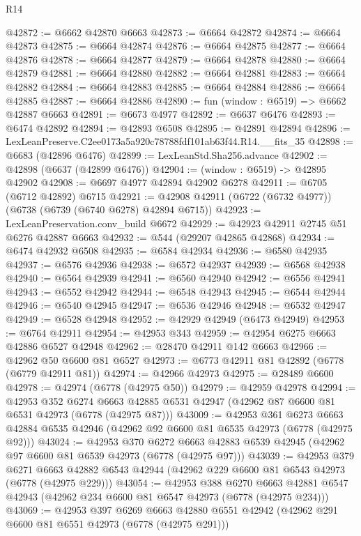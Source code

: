 \begin{lexlean}{R14}
\begin{coremodule}
@42872 := @6662 @42870 @6663
@42873 := @6664 @42872
@42874 := @6664 @42873
@42875 := @6664 @42874
@42876 := @6664 @42875
@42877 := @6664 @42876
@42878 := @6664 @42877
@42879 := @6664 @42878
@42880 := @6664 @42879
@42881 := @6664 @42880
@42882 := @6664 @42881
@42883 := @6664 @42882
@42884 := @6664 @42883
@42885 := @6664 @42884
@42886 := @6664 @42885
@42887 := @6664 @42886
@42890 := fun (window : @6519) => @6662 @42887 @6663
@42891 := @6673 @4977
@42892 := @6637 @6476
@42893 := @6474 @42892
@42894 := @42893 @6508
@42895 := @42891 @42894
@42896 := LexLeanPreserve.C2ee0173a5a920c78788fdf101ab63f44.R14.__fits_35
@42898 := @6683 (@42896 @6476)
@42899 := LexLeanStd.Sha256.advance
@42902 := @42898 (@6637 (@42899 @6476))
@42904 := (window : @6519) -> @42895 @42902
@42908 := @6697 @4977 @42894 @42902 @6278
@42911 := @6705 (@6712 @42892) @6715
@42921 := @42908 @42911 (@6722 (@6732 @4977)) (@6738 (@6739 (@6740 @6278) @42894 @6715))
@42923 := LexLeanPreservation.conv_build @6672
@42929 := @42923 @42911 @2745 @51 @6276 @42887 @6663
@42932 := @544 (@29207 @42865 @42868)
@42934 := @6474 @42932 @6508
@42935 := @6584 @42934
@42936 := @6580 @42935
@42937 := @6576 @42936
@42938 := @6572 @42937
@42939 := @6568 @42938
@42940 := @6564 @42939
@42941 := @6560 @42940
@42942 := @6556 @42941
@42943 := @6552 @42942
@42944 := @6548 @42943
@42945 := @6544 @42944
@42946 := @6540 @42945
@42947 := @6536 @42946
@42948 := @6532 @42947
@42949 := @6528 @42948
@42952 := @42929 @42949 (@6473 @42949)
@42953 := @6764 @42911
@42954 := @42953 @343
@42959 := @42954 @6275 @6663 @42886 @6527 @42948
@42962 := @28470 @42911 @142 @6663
@42966 := @42962 @50 @6600 @81 @6527
@42973 := @6773 @42911 @81 @42892 (@6778 (@6779 @42911 @81))
@42974 := @42966 @42973
@42975 := @28489 @6600
@42978 := @42974 (@6778 (@42975 @50))
@42979 := @42959 @42978
@42994 := @42953
    @352
    @6274
    @6663
    @42885
    @6531
    @42947
    (@42962 @87 @6600 @81 @6531 @42973 (@6778 (@42975 @87)))
@43009 := @42953
    @361
    @6273
    @6663
    @42884
    @6535
    @42946
    (@42962 @92 @6600 @81 @6535 @42973 (@6778 (@42975 @92)))
@43024 := @42953
    @370
    @6272
    @6663
    @42883
    @6539
    @42945
    (@42962 @97 @6600 @81 @6539 @42973 (@6778 (@42975 @97)))
@43039 := @42953
    @379
    @6271
    @6663
    @42882
    @6543
    @42944
    (@42962 @229 @6600 @81 @6543 @42973 (@6778 (@42975 @229)))
@43054 := @42953
    @388
    @6270
    @6663
    @42881
    @6547
    @42943
    (@42962 @234 @6600 @81 @6547 @42973 (@6778 (@42975 @234)))
@43069 := @42953
    @397
    @6269
    @6663
    @42880
    @6551
    @42942
    (@42962 @291 @6600 @81 @6551 @42973 (@6778 (@42975 @291)))

\end{coremodule}
\end{lexlean}
